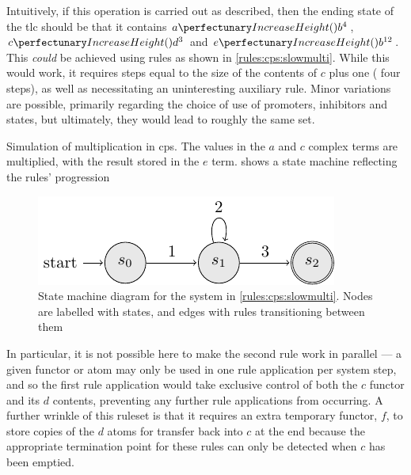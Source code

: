 Intuitively, if this operation is carried out as described, then the ending state of the \gls{tlc} should be that it contains \(\cpfunc{a}{b^4}\), \(\cpfunc{c}{d^3}\) and \(\cpfunc{e}{b^{12}}\).  This \emph{could} be achieved using rules as shown in \cref{rules:cps:slowmulti}.  While this would work, it requires steps equal to the size of the contents of \(c\) plus one (\ie{} four steps), as well as necessitating an uninteresting auxiliary rule.  Minor variations are possible, primarily regarding the choice of use of \glspl{promoter}, \glspl{inhibitor} and states, but ultimately, they would lead to roughly the same set.

\begin{cprulesetfloat}
    \begin{cpruleset}
        
    
    \end{cpruleset}
    \caption[Simulation of multiplication in cP systems]{\label{rules:cps:slowmulti}Simulation of multiplication in \gls{cps}.  The values in the \(a\) and \(c\) complex terms are multiplied, with the result stored in the \(e\) term.   shows a state machine reflecting the rules' progression}
\end{cprulesetfloat}

\begin{figure}
    \centering
    \includegraphics{chapters/cpsystems/ruleset1statemachine.pdf}
    \caption[State machine diagram for the system in \cref{rules:cps:slowmulti}]{State machine diagram for the system in \cref{rules:cps:slowmulti}.  Nodes are labelled with states, and edges with rules transitioning between them}
    \label{fig:cps:slowmulti}
\end{figure}

In particular, it is not possible here to make the second rule work in parallel --- a given \gls{functor} or atom may only be used in one rule application per system step, and so the first rule application would take exclusive control of both the \(c\) \gls{functor} and its \(d\) contents, preventing any further rule applications from occurring.  A further wrinkle of this \gls{ruleset} is that it requires an extra temporary \gls{functor}, \(f\), to store copies of the \(d\) atoms for transfer back into \(c\) at the end because the appropriate termination point for these rules can only be detected when \(c\) has been emptied.

